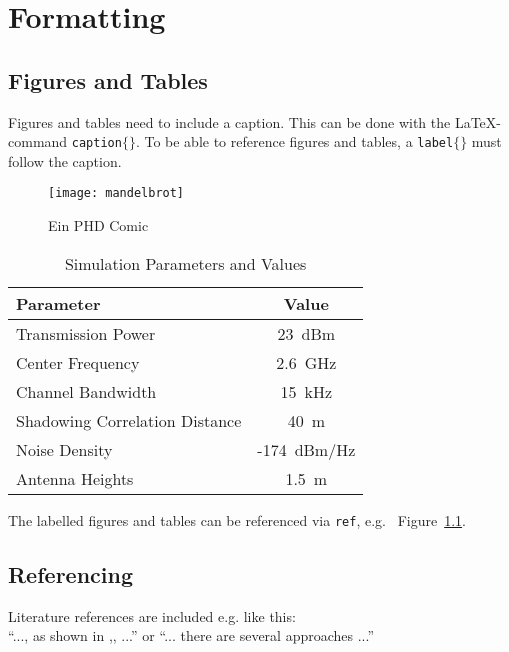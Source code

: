 \chapter{Formatting}

\section{Figures and Tables}
Figures and tables need to include a caption. This can be done with the LaTeX-command \texttt{\bslash caption$\lbrace\rbrace$}. To be able to reference figures and tables, a \texttt{\bslash label$\lbrace\rbrace$} must follow the caption.

\begin{figure}[h!]
  \begin{center}
    \texttt{[image: mandelbrot]}
    \caption{Ein PHD Comic}
    \label{fig:ToUseWithReference}
  \end{center}
\end{figure}

\begin{table}[b]
\begin{center}
\begin{tabular}{|l |c|}
\hline 
\textbf{Parameter} & \textbf{Value} \\
\hline  
\hline 
Transmission Power & 23~dBm\\
\hline 
Center Frequency & 2.6~GHz\\
\hline 
Channel Bandwidth & 15~kHz\\
\hline 
Shadowing Correlation Distance & 40~m\\
\hline 
Noise Density & -174~dBm/Hz\\
\hline 
Antenna Heights & 1.5~m\\
\hline 
\end{tabular}
\caption{Simulation Parameters and Values}\label{tab:param_table}
\end{center}
\end{table}

The labelled figures and tables can be referenced via \texttt{\bslash ref}, e.g. ~Figure~\ref{fig:ToUseWithReference}.
\newpage

\section{Referencing}
Literature references are included e.g. like this:\\
``..., as shown in \cite{eberspaecher97},, ...'' or ``... there are several approaches \cite{arnaud99,griswold90} ...''